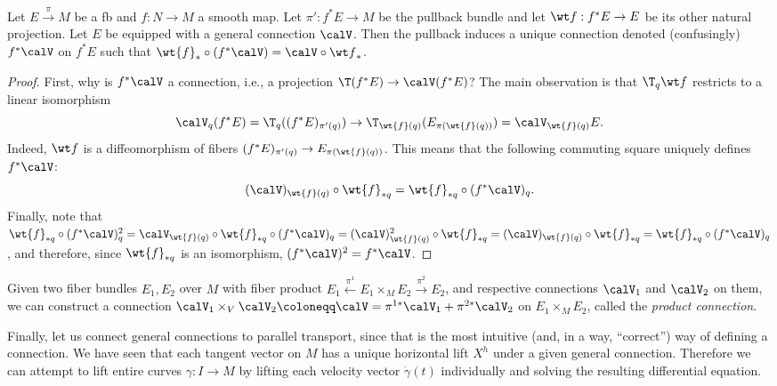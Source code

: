 \begin{prop}
   Let $E\overset{\pi}{\to}M$ be a \gls{fb} and $f:N\to M$ a smooth map. Let $\pi':f^\ast E\to M$ be the pullback bundle and let $\wt f:f^\ast E\to E$ be its other natural projection. Let $E$ be equipped with a general connection $\calV$. Then the pullback induces a unique connection denoted (confusingly) $f^\ast\calV$ on $f^\ast E$ such that $\wt{f}_\ast\circ (f^\ast \calV)=\calV\circ {\wt f}_\ast$.
\end{prop}
\begin{proof}
    First, why is $f^\ast\calV$ a connection, i.e., a projection $\T(f^\ast E)\to \calV(f^\ast E)$? The main observation is that $\T_q{\wt f}$ restricts to a linear isomorphism 
    \[\calV_q (f^\ast E)=\T_q((f^\ast E)_{\pi'(q)})\to \T_{\wt{f}(q)}(E_{\pi(\wt{f}(q))})=\calV_{\wt{f}(q)}E.\]
    Indeed, $\wt f$ is a diffeomorphism of fibers $(f^\ast E)_{\pi'(q)}\to E_{\pi(\wt{f}(q))}$. This means that the following commuting square uniquely defines $f^\ast\calV$:
    \[(\calV)_{\wt{f}(q)}\circ \wt{f}_{\ast q}=\wt{f}_{\ast q}\circ (f^\ast \calV)_q.\]
    Finally, note that $\wt{f}_{\ast q}\circ (f^\ast\calV)^2_q=\calV_{\wt{f}(q)}\circ \wt{f}_{\ast q}\circ (f^\ast\calV)_q=(\calV)^2_{\wt{f}(q)}\circ \wt{f}_{\ast q}=(\calV)_{\wt{f}(q)}\circ \wt{f}_{\ast q}=\wt{f}_{\ast q}\circ (f^\ast \calV)_q$, and therefore, since $\wt{f}_{\ast q}$ is an isomorphism, $(f^\ast\calV)^2=f^\ast\calV$.
\end{proof}

\begin{rem}
    Given two fiber bundles $E_1,E_2$ over $M$ with fiber product $E_1\overset{\pi^1}{\leftarrow}E_1\times_M E_2\overset{\pi^2}{\to}E_2$, and respective connections $\calV_1$ and $\calV_2$ on them, we can construct a connection $\calV_1\times_V\calV_2\coloneqq \calV=\pi^{1\ast}\calV_1+\pi^{2\ast}\calV_2$ on $E_1\times_M E_2$, called the \emph{product connection}.
\end{rem}


Finally, let us connect general connections to parallel transport, since that is the most intuitive (and, in a way, ``correct'') way of defining a connection. We have seen that each tangent vector on $M$ has a unique horizontal lift $X^h$ under a given general connection. Therefore we can attempt to lift entire curves $\gamma:I\to M$ by lifting each velocity vector $\dot\gamma(t)$ individually and solving the resulting differential equation.


